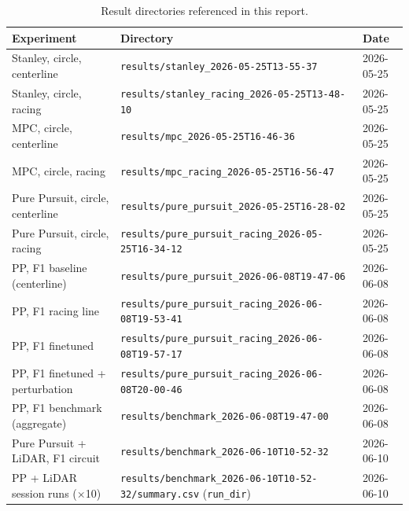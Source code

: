 \documentclass[11pt,a4paper]{article}
\newcommand{\runref}[1]{\texttt{results/#1}}
\begin{document}
\begin{table}[H]
  \centering
  \caption{Result directories referenced in this report.}
  \label{tab:data-index}
  \small
  \begin{tabular}{@{}lll@{}}
    \toprule
    Experiment & Directory & Date \\
    \midrule
    Stanley, circle, centerline       & \runref{stanley\_2026-05-25T13-55-37}           & 2026-05-25 \\
    Stanley, circle, racing           & \runref{stanley\_racing\_2026-05-25T13-48-10}   & 2026-05-25 \\
    MPC, circle, centerline         & \runref{mpc\_2026-05-25T16-46-36}               & 2026-05-25 \\
    MPC, circle, racing               & \runref{mpc\_racing\_2026-05-25T16-56-47}       & 2026-05-25 \\
    Pure Pursuit, circle, centerline  & \runref{pure\_pursuit\_2026-05-25T16-28-02}     & 2026-05-25 \\
    Pure Pursuit, circle, racing      & \runref{pure\_pursuit\_racing\_2026-05-25T16-34-12} & 2026-05-25 \\
    PP, F1 baseline (centerline)      & \runref{pure\_pursuit\_2026-06-08T19-47-06}         & 2026-06-08 \\
    PP, F1 racing line                & \runref{pure\_pursuit\_racing\_2026-06-08T19-53-41} & 2026-06-08 \\
    PP, F1 finetuned                  & \runref{pure\_pursuit\_racing\_2026-06-08T19-57-17} & 2026-06-08 \\
    PP, F1 finetuned + perturbation   & \runref{pure\_pursuit\_racing\_2026-06-08T20-00-46} & 2026-06-08 \\
    PP, F1 benchmark (aggregate)      & \runref{benchmark\_2026-06-08T19-47-00}             & 2026-06-08 \\
    Pure Pursuit + LiDAR, F1 circuit  & \runref{benchmark\_2026-06-10T10-52-32}             & 2026-06-10 \\
    PP + LiDAR session runs ($\times$10)     & \runref{benchmark\_2026-06-10T10-52-32/summary.csv} (\texttt{run\_dir}) & 2026-06-10 \\
    \bottomrule
  \end{tabular}
\end{table}
\end{document}
